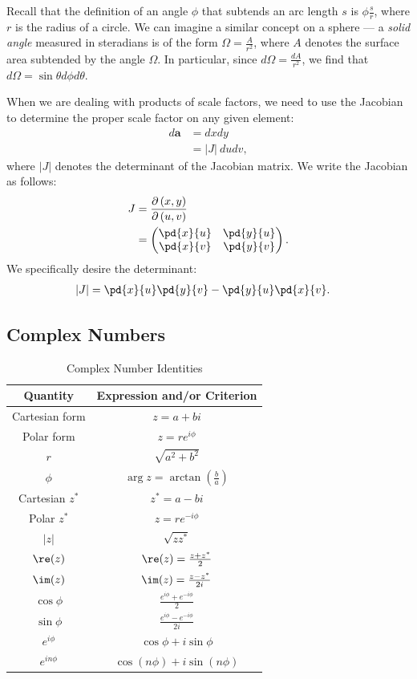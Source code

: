 \documentclass[10pt]{mypackage}
\begin{document}
Recall that the definition of an angle $\phi$ that subtends an arc length $s$ is $\phi \frac{s}{r}$, where $r$ is the radius of a circle. We can imagine a similar concept on a sphere --- a \textit{solid angle} measured in steradians is of the form $\Omega = \frac{A}{r^2}$, where $A$ denotes the surface area subtended by the angle $\Omega$. In particular, since $d\Omega = \frac{dA}{r^2}$, we find that $d\Omega = \sin\theta d\phi d\theta$.\newline

When we are dealing with products of scale factors, we need to use the Jacobian to determine the proper scale factor on any given element:
\begin{align*}
  d\mathbf{a} &= dx dy\\
              &= \left\vert J \right\vert \:du dv,
\end{align*}
where $|J|$ denotes the determinant of the Jacobian matrix. We write the Jacobian as follows:
\begin{align*}
  J &= \frac{\partial \left(x,y\right)}{\partial \left(u,v\right)}\\
    &= \begin{pmatrix}\pd{x}{u} & \pd{y}{u}\\ \pd{x}{v} & \pd{y}{v}\end{pmatrix}.
\end{align*}
We specifically desire the determinant:
\begin{align*}
  |J| &= \pd{x}{u}\pd{y}{v} - \pd{y}{u}\pd{x}{v}.
\end{align*}
\subsection{Complex Numbers}%
\begin{table}
  \centering
  \renewcommand{\arraystretch}{1.75}
  \begin{tabular}{c|c}
    Quantity & Expression and/or Criterion\\
    \hline\hline
    Cartesian form & $z = a + bi$\\
    Polar form & $z = re^{i\phi}$\\
    $r$ & $\sqrt{a^2 + b^2}$\\
    $\phi$ & $\arg z = \arctan\left(\frac{b}{a}\right)$\\
    \hline
    Cartesian $z^{\ast}$ & $z^{\ast} = a-bi$\\
    Polar $z^{\ast}$ & $z = re^{-i\phi}$\\
    $|z|$ & $\sqrt{zz^{\ast}}$\\
    \hline
    $\re(z)$ & $\re(z) = \frac{z + z^{\ast}}{2}$\\
    $\im(z)$ & $\im(z) = \frac{z - z^{\ast}}{2i}$\\
    $\cos\phi$ & $\frac{e^{i\phi} + e^{-i\phi}}{2}$\\
    $\sin\phi$ & $\frac{e^{i\phi} - e^{-i\phi}}{2i}$\\
    \hline
    $e^{i\phi}$ & $\cos \phi + i\sin\phi$\\
    $e^{in\phi}$ & $\cos \left(n\phi\right) + i\sin \left(n\phi\right)$
  \end{tabular}
  \caption{Complex Number Identities}
\end{table}
\end{document}
